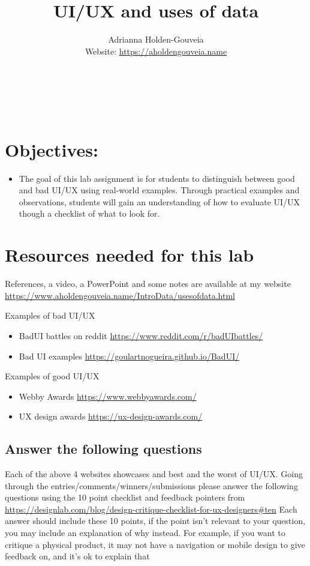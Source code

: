 \documentclass[12pt]{article}
\title{UI/UX and uses of data}
\author{
        Adrianna Holden-Gouveia \\
        Website: \url{https://aholdengouveia.name}\\ 
        \date{\vspace{-5ex}}
        \faLinkedin{: aholdengouveia} \\
        \faGithub {: aholdengouveia} \\
        \faTwitter {: aholdengouveia} \\
        }
\begin{document}
    

\maketitle


\section*{Objectives:}
\begin{itemize}
    \item The goal of this lab assignment is for students to distinguish between good and bad UI/UX using real-world examples. Through practical examples and observations, students will gain an understanding of how to evaluate UI/UX though a checklist of what to look for.
\end{itemize}


\section*{Resources needed for this lab}

References, a video, a PowerPoint and some notes are available at my website
\url {https://www.aholdengouveia.name/IntroData/usesofdata.html}

Examples of bad UI/UX
\begin{itemize}
    \item BadUI battles on reddit \url{https://www.reddit.com/r/badUIbattles/}
    \item Bad UI examples \url{https://goulartnogueira.github.io/BadUI/}
\end{itemize}    

Examples of good UI/UX
\begin{itemize}
    \item Webby Awards \url{https://www.webbyawards.com/}
    \item UX design awards \url{https://ux-design-awards.com/}
\end{itemize}


\subsection*{Answer the following questions}
Each of the above 4 websites showcases and best and the worst of UI/UX. Going through the entries/comments/winners/submissions please answer the following questions using the 10 point checklist and feedback pointers from \url{https://designlab.com/blog/design-critique-checklist-for-ux-designers#ten} Each answer should include these 10 points, if the point isn't relevant to your question, you may include an explanation of why instead. For example, if you want to critique a physical product, it may not have a navigation or mobile design to give feedback on, and it's ok to explain that
\end{document}
